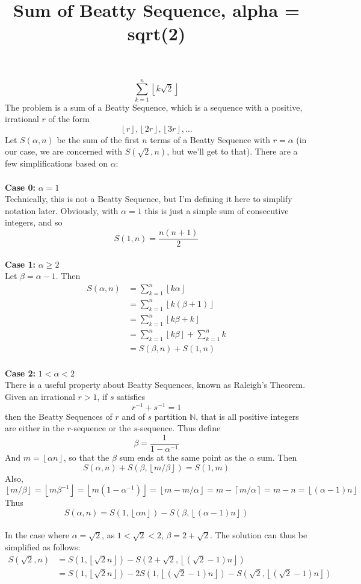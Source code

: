 \documentclass[12pt]{article}
\title{Sum of Beatty Sequence, alpha = sqrt(2)}
\newcommand{\floor}[1]{\left \lfloor #1 \right \rfloor}
\newcommand{\ceil}[1]{\left \lceil #1 \right \rceil}
\begin{document}
\noindent
\[ \sum_{k=1}^n \floor{k\sqrt{2}}\]
The problem is a sum of a Beatty Sequence, which is a sequence with a positive, irrational $r$ of the form
\[\floor{r}, \floor{2r}, \floor{3r}, ...\]
Let $S(\alpha, n)$ be the sum of the first $n$ terms of a Beatty Sequence with $r = \alpha$ (in our case, we are concerned with $S(\sqrt{2}, n)$, but we'll get to that). There are a few simplifications based on $\alpha$:
\\\\
{\bf Case 0:} $\alpha = 1$\\
Technically, this is not a Beatty Sequence, but I'm defining it here to simplify notation later. Obviously, with $\alpha = 1$ this is just a simple sum of consecutive integers, and so
\[S(1, n) = \frac{n(n+1)}{2}\]
\\
{\bf Case 1:} $\alpha \geq 2$\\
Let $\beta = \alpha - 1$. Then
\begin{align*}
    S(\alpha, n) &= \sum_{k=1}^n \floor{k\alpha}\\
    &= \sum_{k=1}^n \floor{k(\beta  +1)}\\
    &= \sum_{k=1}^n \floor{k\beta + k}\\
    &= \sum_{k=1}^n \floor{k\beta} + \sum_{k=1}^n k\\
    &= S(\beta, n) + S(1,n)
\end{align*}
\\
{\bf Case 2:} $1 < \alpha < 2$\\
There is a useful property about Beatty Sequences, known as Raleigh's Theorem. Given an irrational $r > 1$, if $s$ satisfies 
\[r^{-1} + s^{-1} = 1\]
then the Beatty Sequences of $r$ and of $s$ partition $\mathbb{N}$, that is  all positive integers are either in the $r$-sequence or the $s$-sequence. Thus define
\[\beta = \frac{1}{1 - \alpha^{-1}}\]
And $m = \floor{\alpha n}$, so that the $\beta$ sum ends at the same point as the $\alpha$ sum. Then
\[S(\alpha, n) + S(\beta, \floor{m/\beta}) = S(1,m)\]
Also, $\floor{m/\beta} = \floor{m \beta^{-1}} = \floor{m(1-\alpha^{-1})} = \floor{m - m/\alpha} = m - \ceil{m/\alpha} = m - n = \floor{(\alpha -1)n}$\\
Thus
\[S(\alpha, n) = S(1, \floor{\alpha n}) - S(\beta, \floor{(\alpha - 1)n})\]
\\
In the case where $\alpha = \sqrt{2}$, as $1 < \sqrt{2} < 2$, $\beta = 2 + \sqrt{2}$. The solution can thus be simplified as follows:
\begin{align*}
    S(\sqrt{2}, n) &= S(1, \floor{\sqrt{2}n}) - S(2 + \sqrt{2}, \floor{(\sqrt{2} - 1)n})\\
    &= S(1, \floor{\sqrt{2}n}) - 2S(1, \floor{(\sqrt{2} - 1)n}) - S(\sqrt{2}, \floor{(\sqrt{2} - 1)n})
\end{align*}
\end{document}
